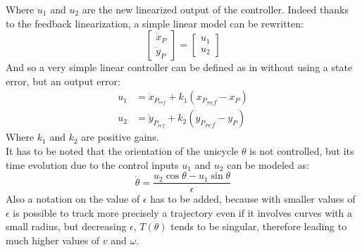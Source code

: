 Where $u_1$ and $u_2$ are the new linearized output of the controller. Indeed thanks to the feedback linearization, a simple linear model can be rewritten:
\begin{equation}
	\left[\begin{matrix}
		\dot{x}_P\\\dot{y}_P
	\end{matrix}\right]=\left[\begin{matrix}
		u_1\\u_2
	\end{matrix}\right]
\end{equation}
And so a very simple linear controller can be defined as in \cite{siciliano} without using a state error, but an output error:
\begin{equation}
	\begin{split}
		u_1&=\dot{x}_{P_{ref}}+k_1\left({x_P}_{ref}-x_P\right)\\
		u_2&=\dot{y}_{P_{ref}}+k_2\left({y_P}_{ref}-y_P\right)
	\end{split}
\end{equation}
Where $k_1$ and $k_2$ are positive gains. \\
It has to be noted that the orientation of the unicycle  $\theta$ is not controlled, but its time evolution due to the control inputs $u_1$ and $u_2$ can be modeled as:
\begin{equation}
 	\dot{\theta}=\frac{u_2\cos\theta-u_1\sin\theta}{\epsilon}
\end{equation}
Also a notation on the value of $\epsilon$ has to be added, because with smaller values of $\epsilon$ is possible to track more precisely a trajectory even if it involves curves with a small radius, but decreasing $\epsilon$, $T(\theta)$ tends to be singular, therefore leading to much higher values of $v$ and $\omega$.

